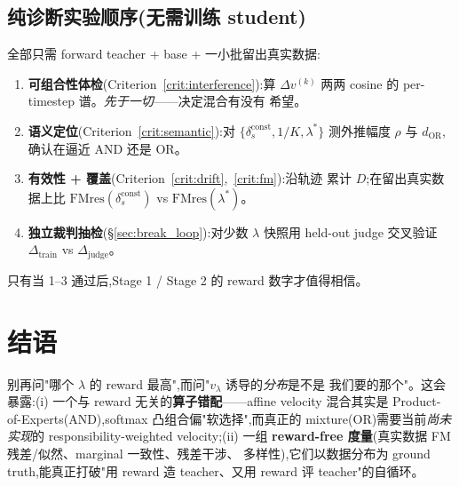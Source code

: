 \documentclass[11pt,a4paper]{article}
\newcommand{\const}{\mathrm{const}}
\theoremstyle{definition}
\begin{document}
\subsection{纯诊断实验顺序(无需训练 student)}

全部只需 forward teacher + base + 一小批留出真实数据:

\begin{enumerate}[leftmargin=1.5em]
\item \textbf{可组合性体检}(Criterion~\ref{crit:interference}):算
$\Delta v^{(k)}$ 两两 cosine 的 per-timestep 谱。\emph{先于一切}——决定混合有没有
希望。
\item \textbf{语义定位}(Criterion~\ref{crit:semantic}):对 $\{\delta_s^\const,
1/K, \lambda^*\}$ 测外推幅度 $\rho$ 与 $d_{\text{OR}}$,确认在逼近 AND 还是 OR。
\item \textbf{有效性 + 覆盖}(Criterion~\ref{crit:drift},~\ref{crit:fm}):沿轨迹
累计 $D$;在留出真实数据上比 $\mathrm{FMres}(\delta_s^\const)$ vs
$\mathrm{FMres}(\lambda^*)$。
\item \textbf{独立裁判抽检}(\S\ref{sec:break_loop}):对少数 $\lambda$ 快照用
held-out judge 交叉验证 $\Delta_{\text{train}}$ vs $\Delta_{\text{judge}}$。
\end{enumerate}

只有当 1--3 通过后,Stage 1 / Stage 2 的 reward 数字才值得相信。

\section*{结语}

\begin{tcolorbox}[colback=yellow!5,colframe=yellow!60!black,title=\textbf{一句话}]
别再问"哪个 $\lambda$ 的 reward 最高",而问"$v_\lambda$ 诱导的\emph{分布}是不是
我们要的那个"。这会暴露:(i) 一个与 reward 无关的\textbf{算子错配}——affine
velocity 混合其实是 Product-of-Experts(AND),softmax 凸组合偏"软选择",而真正的
mixture(OR)需要当前\emph{尚未实现}的 responsibility-weighted velocity;(ii) 一组
\textbf{reward-free 度量}(真实数据 FM 残差/似然、marginal 一致性、残差干涉、
多样性),它们以数据分布为 ground truth,能真正打破"用 reward 造 teacher、又用
reward 评 teacher"的自循环。
\end{tcolorbox}
\end{document}
